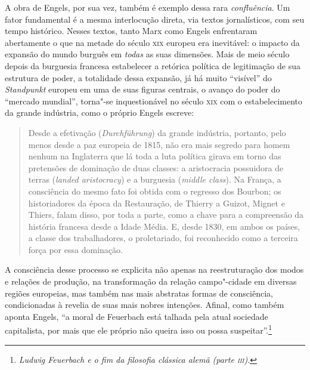 A obra de Engels, por sua vez, também é exemplo dessa rara
\emph{confluência}. Um fator fundamental é a mesma interlocução direta,
via textos jornalísticos, com seu tempo histórico. Nesses textos, tanto
Marx como Engels enfrentaram abertamente o que na metade do século
\textsc{xix} europeu era inevitável: o impacto da expansão do mundo
burguês em \emph{todas} as suas dimensões. Mais de meio século depois da
burguesia francesa estabelecer a retórica política de legitimação de sua
estrutura de poder, a totalidade dessa expansão, já há muito ``visível''
do \emph{Standpunkt} europeu em uma de suas figuras centrais, o avanço %
do poder do ``mercado mundial'', torna"-se inquestionável no século %
\textsc{xix} com o estabelecimento da grande indústria, como o próprio
Engels escreve:

\begin{quote}
Desde a efetivação (\emph{Durchführung}) da grande indústria,
portanto, pelo menos desde a paz europeia de 1815, não era mais segredo
para homem nenhum na Inglaterra que lá toda a luta política girava em
torno das pretensões de dominação de duas classes: a aristocracia
possuidora de terras (\emph{landed aristocracy}) e a burguesia
(\emph{middle class}). Na França, a consciência do mesmo fato foi obtida
com o regresso dos Bourbon; os historiadores da época da Restauração, de
Thierry a Guizot, Mignet e Thiers, falam disso, por toda a parte, como a
chave para a compreensão da história francesa desde a Idade Média. E,
desde 1830, em ambos os países, a classe dos trabalhadores, o
proletariado, foi reconhecido como a terceira força por essa dominação.
\end{quote}

A consciência desse processo se explicita não apenas na reestruturação
dos modos e relações de produção, na transformação da relação
campo"-cidade em diversas regiões europeias, mas também nas mais
abstratas formas de consciência, condicionadas à revelia de suas mais
nobres intenções. Afinal, como também aponta Engels, ``a moral de
Feuerbach está talhada pela atual sociedade capitalista, por mais que
ele próprio não queira isso ou possa suspeitar''.\footnote{\emph{Ludwig
  Feuerbach e o fim da filosofia clássica alemã (parte \textsc{iii})}.}

